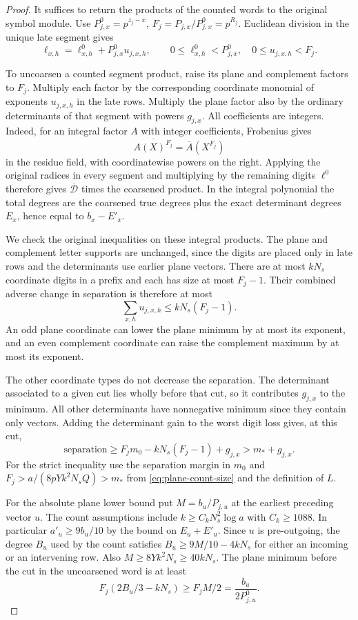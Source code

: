 \begin{proof}
It suffices to return the products of the counted words to
the original symbol module. Use \(P^0_{j,x}=p^{z_j-x}\),
\(F_j=P_{j,x}/P^0_{j,x}=p^{R_j}\). Euclidean division in the unique late segment gives
\[
 \ell_{x,h}=\ell^0_{x,h}+P^0_{j,x}u_{j,x,h},\qquad
 0\le\ell^0_{x,h}<P^0_{j,x},\quad 0\le u_{j,x,h}<F_j .
\]

To
uncoarsen a counted segment product, raise its plane and
complement factors to \(F_j\). Multiply each factor by the
corresponding coordinate monomial of exponents \(u_{j,x,h}\)
in the late rows. Multiply the plane factor also by the
ordinary determinants of that segment with powers \(g_{j,x}\).
All coefficients are integers. Indeed, for an integral factor \(A\) with integer coefficients, Frobenius gives
\[
 \overline{A(X)^{F_j}}=\overline{A}(X^{F_j})
\]
in the residue field, with coordinatewise powers on the right. Applying the original radices in every
segment and multiplying by the remaining digits \(\ell^0\)
therefore gives \(\overline{\mathcal D}\) times the coarsened
product. In the integral polynomial the total degrees are
the coarsened true degrees plus the exact determinant degrees
\(E_x\), hence equal to \(b_x-E'_x\).

We check the original inequalities on these integral products.
The plane and complement letter supports are unchanged, since
the digits are placed only in late rows and the determinants
use earlier plane vectors. There are at most \(kN_s\) coordinate digits in a prefix and each has size at most \(F_j-1\). Their combined adverse change in separation is therefore at most
\[
 \sum_{x,h}u_{j,x,h}\le kN_s(F_j-1).
\]
An odd plane coordinate can lower the plane
minimum by at most its exponent, and an even complement
coordinate can raise the complement maximum by at most its
exponent.

The other coordinate types do not decrease the
separation. The determinant associated to a given cut lies
wholly before that cut, so it contributes \(g_{j,x}\) to the
minimum. All other determinants have nonnegative minimum
since they contain only vectors. Adding the determinant gain to the worst digit loss gives, at this cut,
\[
 \text{separation}\ge F_jm_0-kN_s(F_j-1)+g_{j,x}>m_*+g_{j,x}.
\]
For the strict inequality use the separation margin in \(m_0\) and
\(F_j>a/(8pYk^2N_sQ)>m_*\) from \eqref{eq:plane-count-size} and
the definition of \(L\).

For the absolute plane lower bound put \(M=b_u/P_{j,u}\) at
the earliest preceding vector \(u\). The count assumptions
include \(k\ge C_kN_s^2\log a\) with \(C_k\ge1088\). In
particular \(a'_u\ge9b_u/10\) by the bound on \(E_u+E'_u\).
Since \(u\) is pre-outgoing, the degree \(B_u\) used by the
count satisfies \(B_u\ge 9M/10-4kN_s\) for either an
incoming or an intervening row. Also \(M\ge8Yk^2N_s\ge
40kN_s\). The plane minimum before the cut in the uncoarsened
word is at least
\[
 F_j(2B_u/3-kN_s)\ge F_j M/2=\frac{b_u}{2P^0_{j,u}}.
\]


\end{proof}
